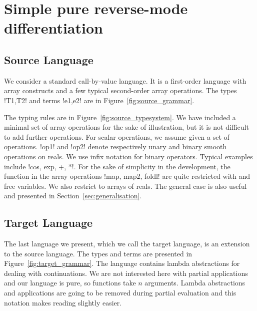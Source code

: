 \section{Simple pure reverse-mode differentiation}
\label{sec:simplediff}

\subsection{Source Language} 

We consider a standard call-by-value language. 
It is a first-order language with array constructs and a few typical second-order array operations. 
The types !T1,T2! and terms !e1,e2! are in Figure~\ref{fig:source_grammar}.



The typing rules are in Figure~\ref{fig:source_typesystem}. We have included a minimal set of array operations for the sake of illustration, 
but it is not difficult to add further operations. For scalar operations, we assume given a set of operations. 
!op1! and !op2! denote respectively unary and binary smooth operations on reals. 
We use infix notation for binary operators.
Typical examples include !cos, exp, +, *!. 
For the sake of simplicity in the development, the function in the array operations !map, map2, foldl! are quite restricted with and free variables. 
We also restrict to arrays of reals.
The general case is also useful and presented in Section~\ref{sec:generalisation}.




\subsection{Target Language}

The last language we present, which we call the target language, is an extension to the source language. 
The types and terms are presented in Figure~\ref{fig:target_grammar}.
The language contains lambda abstractions for dealing with continuations. 
We are not interested here with partial applications and our language is pure, so functions take $n$ arguments.
Lambda abstractions and applications are going to be removed during partial evaluation and this notation makes reading slightly easier.



